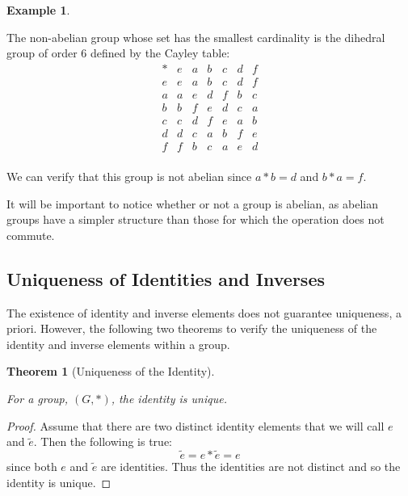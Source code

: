\documentclass[
]{book}
\newtheorem{theorem}{Theorem}[chapter]
\theoremstyle{definition}
\theoremstyle{definition}
\newtheorem{example}{Example}[chapter]
\theoremstyle{definition}
\theoremstyle{definition}
\theoremstyle{remark}
\begin{document}
\begin{example}
\protect\hypertarget{exm:dihedral6}{}\label{exm:dihedral6}

The non-abelian group whose set has the smallest cardinality is the dihedral group of order 6 defined by the Cayley table:
\[\begin{array}{c|cccccc}
* & e & a & b & c & d & f \\ \hline
e & e & a & b & c & d & f \\
a & a & e & d & f & b & c \\
b & b & f & e & d & c & a \\
c & c & d & f & e & a & b \\
d & d & c & a & b & f & e \\
f & f & b & c & a & e & d \\
\end{array}\]

We can verify that this group is not abelian since \(a*b = d\) and \(b*a=f\).

\end{example}

It will be important to notice whether or not a group is abelian, as abelian groups have a simpler structure than those for which the operation does not commute.

\hypertarget{uniqueness-of-identities-and-inverses}{%
\subsection{Uniqueness of Identities and Inverses}\label{uniqueness-of-identities-and-inverses}}

The existence of identity and inverse elements does not guarantee uniqueness, a priori. However, the following two theorems to verify the uniqueness of the identity and inverse elements within a group.

\begin{theorem}[Uniqueness of the Identity]
\protect\hypertarget{thm:unlabeled-div-78}{}\label{thm:unlabeled-div-78}

For a group, \((G,*)\), the identity is unique.

\end{theorem}

\begin{proof}

Assume that there are two distinct identity elements that we will call \(e\) and \(\tilde{e}\). Then the following is true:\[\tilde{e}= e*\tilde{e} = e\] since both \(e\) and \(\tilde{e}\) are identities. Thus the identities are not distinct and so the identity is unique.

\end{proof}
\end{document}
